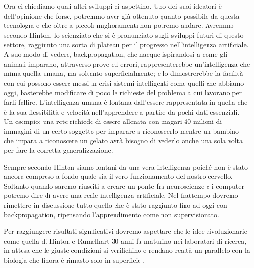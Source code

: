 \documentclass [12pt,oneside,a4paper,openany]{book}
\begin{document}
Ora ci chiediamo quali altri sviluppi ci aspettino. Uno dei suoi ideatori è dell'opinione che forse, potremmo aver già ottenuto quanto possibile da questa tecnologia e che oltre a piccoli miglioramenti non potremo andare. Avremmo secondo Hinton, lo scienziato che si è pronunciato sugli sviluppi futuri di questo settore, raggiunto una sorta di plateau per il progresso nell'intelligenza artificiale. A suo modo di vedere, backpropagation, che nacque ispirandosi a come gli animali imparano, attraverso prove ed errori, rappresenterebbe un'intelligenza che mima quella umana, ma soltanto superficialmente; e lo dimostrerebbe la facilità con cui possono essere messi in crisi sistemi intelligenti come quelli che abbiamo oggi, basterebbe modificare di poco le richieste del problema a cui lavorano per farli fallire. L'intelligenza umana è lontana dall'essere rappresentata in quella che è la sua flessibilità e velocità nell'apprendere a partire da pochi dati essenziali. Un esempio: una rete richiede di essere allenata con magari 40 milioni di immagini di un certo soggetto per imparare a riconoscerlo mentre un bambino che impara a riconoscere un gelato avrà bisogno di vederlo anche una sola volta per fare la corretta generalizzazione. 

Sempre secondo Hinton siamo lontani da una vera intelligenza poiché non è stato ancora compreso a fondo quale sia il vero funzionamento del nostro cervello. Soltanto quando saremo riusciti a creare un ponte fra neuroscienze e i computer potremo dire di avere una reale intelligenza artificiale. Nel frattempo dovremo rimettere in discussione tutto quello che è stato raggiunto fino ad oggi con backpropagation, ripensando l'apprendimento come non supervisionato.

Per raggiungere risultati significativi dovremo aspettare che le idee rivoluzionarie come quella di Hinton e Rumelhart 30 anni fa maturino nei laboratori di ricerca, in attesa che le giuste condizioni si verifichino e rendano realtà un parallelo con la biologia che finora è rimasto solo in superficie \cite{mit-ai}. 



\end{document}
